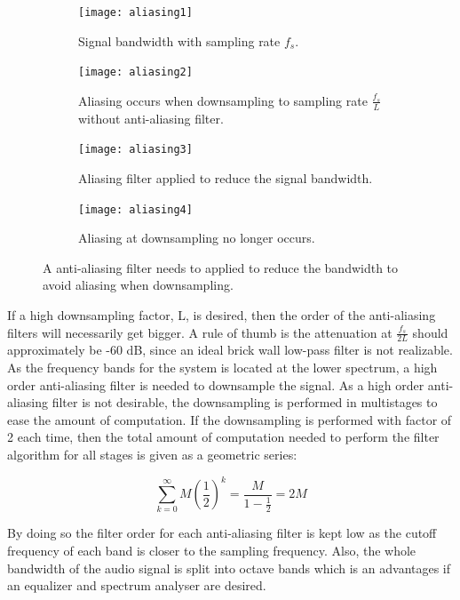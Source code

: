 \begin{figure}[H]
\centering
\begin{subfigure}[t]{0.44\textwidth}
\texttt{[image: aliasing1]}
	\caption{Signal bandwidth with sampling rate $f_s$.}
	\label{fig:aliasing1}
\end{subfigure}
\hspace{6mm} 
\begin{subfigure}[t]{0.47\textwidth}
\texttt{[image: aliasing2]}
	\caption{Aliasing occurs when downsampling to sampling rate $\frac{f_s}{L}$ without anti-aliasing filter.}
	\label{fig:aliasing2}
\end{subfigure}
\hspace{6mm}
\begin{subfigure}[b]{0.44\textwidth}
\texttt{[image: aliasing3]}
	\caption{Aliasing filter applied to reduce the signal bandwidth.}
	\label{fig:aliasing3}
\end{subfigure}
\hspace{6mm} 
\begin{subfigure}[b]{0.47\textwidth}
\texttt{[image: aliasing4]}
	\caption{Aliasing at downsampling no longer occurs.}
	\label{fig:aliasing4}
\end{subfigure}
\caption{A anti-aliasing filter needs to applied to reduce the bandwidth to avoid aliasing when downsampling.}
\label{fig:aliasing}
\end{figure}

If a high downsampling factor, L, is desired, then the order of the anti-aliasing filters will necessarily get bigger. A rule of thumb is the attenuation at $\frac{f_s}{2L}$ should approximately be -60 dB, since an ideal brick wall low-pass filter is not realizable. As the frequency bands for the system is located at the lower spectrum, a high order anti-aliasing filter is needed to downsample the signal. As a high order anti-aliasing filter is not desirable, the downsampling is performed in multistages to ease the amount of computation. If the downsampling is performed with factor of 2 each time, then the total amount of computation needed to perform the filter algorithm for all stages is given as a geometric series:

\begin{equation} \label{eq:z_transformation_example}
\sum_{k=0}^{\infty}M \left( \frac{1}{2} \right)^k  = \frac{M}{1-\frac{1}{2}} = 2M
\end{equation}

By doing so the filter order for each anti-aliasing filter is kept low as the cutoff frequency of each band is closer to the sampling frequency. Also, the whole bandwidth of the audio signal is split into octave bands which is an advantages if an equalizer and spectrum analyser are desired.

